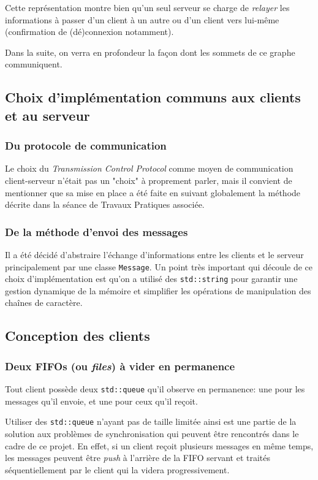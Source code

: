 \documentclass{article}
\begin{document}
\noindent Cette représentation montre bien qu'un seul serveur se charge de \textit{relayer} les informations à passer d'un client à un autre ou d'un client vers lui-même (confirmation de (dé)connexion notamment). 

\noindent Dans la suite, on verra en profondeur la façon dont les sommets de ce graphe communiquent.

\subsection{Choix d'implémentation communs aux clients et au serveur}

\subsubsection{Du protocole de communication}
Le choix du \textit{Transmission Control Protocol} \cite{TCP-IP} comme moyen de communication client-serveur n'était pas un "choix" à proprement parler, mais il convient de mentionner que sa mise en place a été faite en suivant globalement la méthode décrite dans la séance de Travaux Pratiques associée. \cite{TP_OS}

\subsubsection{De la méthode d'envoi des messages}
\noindent Il a été décidé d'abstraire l'échange d'informations entre les clients et le serveur principalement par une classe \texttt{Message}. Un point très important qui découle de ce choix d'implémentation est qu'on a utilisé des \texttt{std::string} \cite{std::string} pour garantir une gestion dynamique de la mémoire et simplifier les opérations de manipulation des chaînes de caractère.

\subsection{Conception des clients}

\subsubsection{Deux FIFOs (ou \textit{files}) à vider en permanence}
\noindent Tout client possède deux \texttt{std::queue} \cite{std::queue} qu'il observe en permanence: une pour les messages qu'il envoie, et une pour ceux qu'il reçoit. 

\noindent Utiliser des \texttt{std::queue} n'ayant pas de taille limitée ainsi est une partie de la solution aux problèmes de synchronisation qui peuvent être rencontrés dans le cadre de ce projet. En effet, si un client reçoit plusieurs messages en même temps, les messages peuvent être \textit{push} à l'arrière de la FIFO servant et traités séquentiellement par le client qui la videra progressivement.
\end{document}
